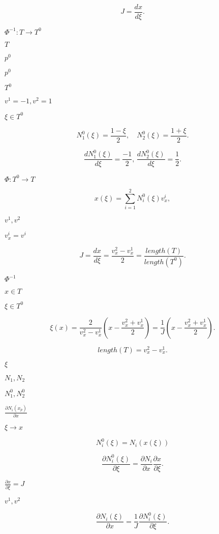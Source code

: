 \documentclass{article}
\begin{document}
\[ J = \frac{dx}{d\xi}. \]
\pagebreak

$ \Phi^{-1} : T \to T^0 $
\pagebreak

$ T$
\pagebreak

$ p^0$
\pagebreak

$ p^0 $
\pagebreak

$T^0 $
\pagebreak

$
v^1 = -1, v^2 = 1 $
\pagebreak

$ \xi \in T^0 $
\pagebreak

\[N^0_1(\xi) = \frac{1 - \xi}{2}, \quad N^0_2(\xi) = \frac{1 + \xi}{2}. \]
\pagebreak

\[\frac{d N^0_1(\xi)}{d\xi} = \frac{-1}{2}, \, \frac{d N^0_2(\xi)}{d\xi}
= \frac{1}{2}. \]
\pagebreak

$ \Phi: T^0 \to T $
\pagebreak

\[ x(\xi) = \sum_{i=1}^2 N^0_i(\xi) v^i_x, \]
\pagebreak

$ v^1, v^2$
\pagebreak

$ v^i_x = v^i $
\pagebreak

\[ J = \frac{dx}{d\xi} = \frac{v^2_x - v^1_x}{2} = \frac{length(T)
}{length(T^0)}. \]
\pagebreak

$ \Phi^{-1} $
\pagebreak

$ x \in T $
\pagebreak

$ \xi \in T^0$
\pagebreak

\[ \xi(x) = \frac{2}{v^2_x - v^1_x} (x - \frac{v^2_x + v^1_x}{2}) =
\frac{1}{J}(x - \frac{v^2_x + v^1_x}{2}). \]
\pagebreak

\[ length(T) = v^2_x - v^1_x. \]
\pagebreak

$ \xi $
\pagebreak

$ N_1, N_2 $
\pagebreak

$ N^0_1, N^0_2 $
\pagebreak

$ \frac{\partial N_i(x_p)}{\partial x}$
\pagebreak

$ \xi \to x $
\pagebreak

\[ N^0_i(\xi) = N_i(x(\xi)) \]
\pagebreak

\[ \frac{\partial N^0_i(\xi)}{\partial \xi} = \frac{\partial
N_i}{\partial x} \frac{\partial x}{\partial \xi}. \]
\pagebreak

$ \frac{\partial x}{\partial \xi} = J $
\pagebreak

$ v^1, v^2 $
\pagebreak

\[ \frac{\partial N_i(\xi)}{\partial x} = \frac{1}{J} \frac{\partial
N^0_i(\xi)}{\partial \xi}. \]
\pagebreak
\end{document}
